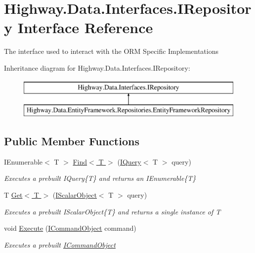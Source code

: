 \hypertarget{interface_highway_1_1_data_1_1_interfaces_1_1_i_repository}{\section{Highway.\-Data.\-Interfaces.\-I\-Repository Interface Reference}
\label{interface_highway_1_1_data_1_1_interfaces_1_1_i_repository}
}


The interface used to interact with the O\-R\-M Specific Implementations  


Inheritance diagram for Highway.\-Data.\-Interfaces.\-I\-Repository\-:\begin{figure}[H]
\begin{center}
\leavevmode
\includegraphics[height=2.000000cm]{interface_highway_1_1_data_1_1_interfaces_1_1_i_repository}
\end{center}
\end{figure}
\subsection*{Public Member Functions}
\begin{DoxyCompactItemize}
\item 
I\-Enumerable$<$ T $>$ \hyperlink{interface_highway_1_1_data_1_1_interfaces_1_1_i_repository_a18bd55ae31839881dc43cb0ba958086b}{Find$<$ T $>$} (\hyperlink{interface_highway_1_1_data_1_1_interfaces_1_1_i_query-g}{I\-Query}$<$ T $>$ query)
\begin{DoxyCompactList}\small\item\em Executes a prebuilt I\-Query\{\-T\} and returns an I\-Enumerable\{\-T\} \end{DoxyCompactList}\item 
T \hyperlink{interface_highway_1_1_data_1_1_interfaces_1_1_i_repository_af4256e7e2f82fd545161eeedd323712b}{Get$<$ T $>$} (\hyperlink{interface_highway_1_1_data_1_1_interfaces_1_1_i_scalar_object-g}{I\-Scalar\-Object}$<$ T $>$ query)
\begin{DoxyCompactList}\small\item\em Executes a prebuilt I\-Scalar\-Object\{\-T\} and returns a single instance of {\itshape T}  \end{DoxyCompactList}\item 
void \hyperlink{interface_highway_1_1_data_1_1_interfaces_1_1_i_repository_a2f2f0b12b547d9d5eeaf18d013b7c008}{Execute} (\hyperlink{interface_highway_1_1_data_1_1_interfaces_1_1_i_command_object}{I\-Command\-Object} command)
\begin{DoxyCompactList}\small\item\em Executes a prebuilt \hyperlink{interface_highway_1_1_data_1_1_interfaces_1_1_i_command_object}{I\-Command\-Object} \end{DoxyCompactList}\end{DoxyCompactItemize}
